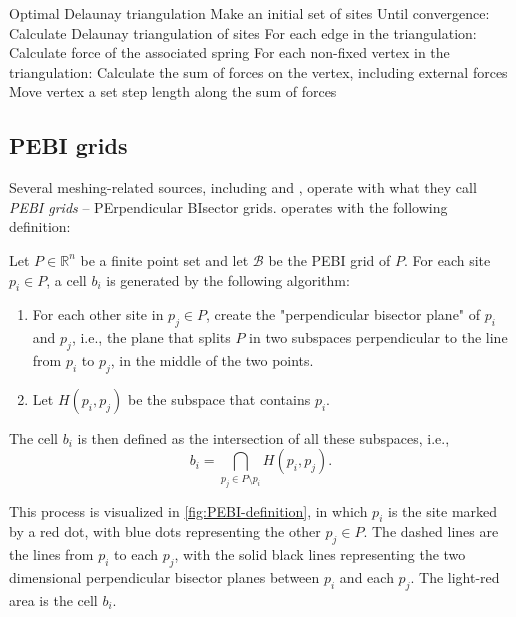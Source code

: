 \begin{pseudocode}[label=alg:delaunay_force]{Optimal Delaunay triangulation}
    Make an initial set of sites
    Until convergence:
        Calculate Delaunay triangulation of sites
        For each edge in the triangulation:
            Calculate force of the associated spring
        For each non-fixed vertex in the triangulation:
            Calculate the sum of forces on the vertex, including external forces
            Move vertex a set step length along the sum of forces
\end{pseudocode}

\subsection{PEBI grids}
Several meshing-related sources, including \cite{UPR_chapter} and \cite{UPR_thesis}, operate with what they call \emph{PEBI grids} -- PErpendicular BIsector grids. \textcite{UPR_thesis} operates with the following definition:

\begin{definition}
\label{def:PEBI-grid}
Let $P\in \mathbb{R}^n$ be a finite point set and let $\mathcal{B}$ be the PEBI grid of $P$. For each site $p_i \in P$, a cell $b_i$ is generated by the following algorithm:
\begin{enumerate}
    \item For each other site in $p_j \in P$, create the "perpendicular bisector plane" of $p_i$ and $p_j$, i.e., the plane that splits $P$ in two subspaces perpendicular to the line from $p_i$ to $p_j$, in the middle of the two points.
    \item Let $H(p_i, p_j)$ be the subspace that contains $p_i$.
\end{enumerate}
The cell $b_i$ is then defined as the intersection of all these subspaces, i.e.,
\begin{equation}
    b_i = \bigcap_{p_j \in P \setminus p_i} H(p_i, p_j).
\end{equation}
\end{definition}

This process is visualized in \autoref{fig:PEBI-definition}, in which $p_i$ is the site marked by a red dot, with blue dots representing the other $p_j \in P$. The dashed lines are the lines from $p_i$ to each $p_j$, with the solid black lines representing the two dimensional perpendicular bisector planes between $p_i$ and each $p_j$. The light-red area is the cell $b_i$.

